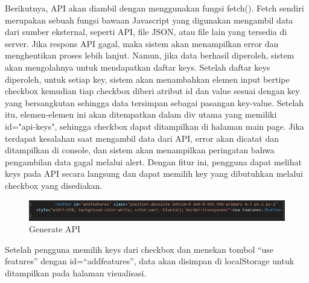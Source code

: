Berikutnya, API akan diambil dengan menggunakan fungsi fetch(). Fetch sendiri merupakan sebuah fungsi bawaan Javascript yang digunakan mengambil data dari sumber eksternal, seperti API, file JSON, atau file lain yang tersedia di server.  Jika respons API gagal, maka sistem akan menampilkan error dan menghentikan proses lebih lanjut. Namun, jika data berhasil diperoleh, sistem akan mengolahnya untuk mendapatkan daftar keys. Setelah daftar keys diperoleh, untuk setiap key, sistem akan menambahkan elemen input bertipe checkbox kemudian tiap checkbox diberi atribut id dan value sesuai dengan key yang bersangkutan sehingga data tersimpan sebagai pasangan key-value. Setelah itu, elemen-elemen ini akan ditempatkan dalam div utama yang memiliki id="api-keys", sehingga checkbox dapat ditampilkan di halaman main page. 
Jika terdapat kesalahan saat mengambil data dari API, error akan dicatat dan ditampilkan di console, dan sistem akan menampilkan peringatan bahwa pengambilan data gagal melalui alert. Dengan fitur ini, pengguna dapat melihat keys pada API secara langsung dan dapat memilih key yang dibutuhkan melalui checkbox yang disediakan. 
	\begin{figure}[H]
	\centering
	\includegraphics[width=0.8\linewidth]{gambar/Pembahasan/use Feature.png}
	\caption{Generate API}
	\label{Fungsi Use Feature}
\end{figure}
Setelah pengguna memilih keys dari checkbox dan menekan tombol “use features” dengan id=“addfeatures”, data akan disimpan di localStorage untuk ditampilkan pada halaman visualisasi. 


